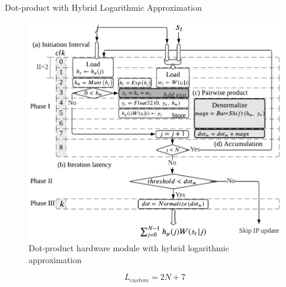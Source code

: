 \begin{frame}{Dot-product with Hybrid Logarithmic Approximation}
	\begin{figure}
		\centering
		\includegraphics[width=0.4\columnwidth]{../chapters/sbs_accelerator/figures/dot_product_log.pdf}
		\caption{Dot-product hardware module with hybrid logarithmic approximation}
	\end{figure}
	
	\vfill %
	
	\[
	L_{custom}=2N+7
	\]
\end{frame}

